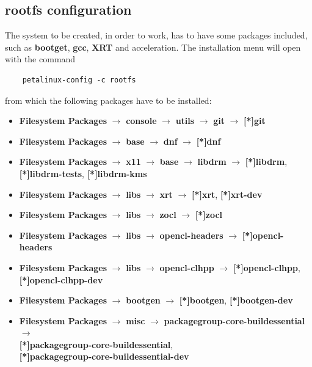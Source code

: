 \subsection{rootfs configuration}
The system to be created, in order to work, has to have some packages included, such as \textbf{bootget}, \textbf{gcc}, \textbf{XRT} and acceleration. The installation menu will open with the command
\begin{verbatim}
	petalinux-config -c rootfs
\end{verbatim}
from which the following packages have to be installed:
\begin{itemize}
	\item \textbf{Filesystem Packages} $\rightarrow$ \textbf{console} $\rightarrow$ \textbf{utils} $\rightarrow$ \textbf{git} $\rightarrow$ \textbf{[*]git}
	
	\item \textbf{Filesystem Packages} $\rightarrow$ \textbf{base} $\rightarrow$ \textbf{dnf} $\rightarrow$ \textbf{[*]dnf}
	
	\item \textbf{Filesystem Packages} $\rightarrow$ \textbf{x11} $\rightarrow$ \textbf{base} $\rightarrow$ \textbf{libdrm} $\rightarrow$ \textbf{[*]libdrm}, \textbf{[*]libdrm-tests}, \textbf{[*]libdrm-kms}
	
	\item \textbf{Filesystem Packages} $\rightarrow$ \textbf{libs} $\rightarrow$ \textbf{xrt} $\rightarrow$ \textbf{[*]xrt}, \textbf{[*]xrt-dev}
	
	\item \textbf{Filesystem Packages} $\rightarrow$ \textbf{libs} $\rightarrow$ \textbf{zocl} $\rightarrow$ \textbf{[*]zocl}
	
	\item \textbf{Filesystem Packages} $\rightarrow$ \textbf{libs} $\rightarrow$ \textbf{opencl-headers} $\rightarrow$ \textbf{[*]opencl-headers}
	
	\item \textbf{Filesystem Packages} $\rightarrow$ \textbf{libs} $\rightarrow$ \textbf{opencl-clhpp} $\rightarrow$ \textbf{[*]opencl-clhpp},\\ \textbf{[*]opencl-clhpp-dev}
	
	\item \textbf{Filesystem Packages} $\rightarrow$ \textbf{bootgen} $\rightarrow$ \textbf{[*]bootgen}, \textbf{[*]bootgen-dev}
	
	\item \textbf{Filesystem Packages} $\rightarrow$ \textbf{misc} $\rightarrow$ \textbf{packagegroup-core-buildessential} $\rightarrow$\\ \textbf{[*]packagegroup-core-buildessential},\\ \textbf{[*]packagegroup-core-buildessential-dev}
	

\end{itemize}
